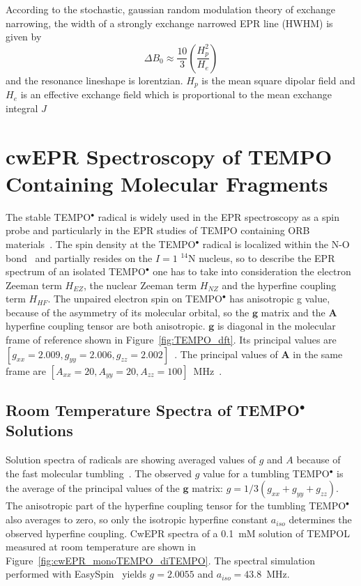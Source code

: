 According to the stochastic, gaussian random modulation theory of exchange narrowing, the width of a strongly exchange narrowed EPR line (HWHM) is given by
\begin{equation}
\label{eq:exch_narrowing}
\Delta B_0 \approx\frac{10}{3}\left(\frac{H_p^2}{H_e}\right)
\end{equation}
and the resonance lineshape is lorentzian. $H_p$ is the mean square dipolar field and $H_e$ is an effective exchange field which is proportional to the mean exchange integral $J$~\cite{Oreilly_1971}


\section{cwEPR Spectroscopy of TEMPO Containing Molecular Fragments}
The stable TEMPO$^\bullet$ radical is widely used in the EPR spectroscopy as a spin probe and particularly in the EPR studies of TEMPO containing ORB materials~\cite{nakahara2002_cpl, nishide2004_electact, bahaceci2013_jpowersources, aydin2015_jsoistatelect, khodeir2019_softmatter, Zhang2018}. The spin density at the TEMPO$^\bullet$ radical is localized within the N-O bond~\cite{Owenius2001} and partially resides on the $I=1$ $^{14}$N nucleus, so to describe the EPR spectrum of an isolated TEMPO$^\bullet$ one has to take into consideration the electron Zeeman term $H_{EZ}$, the nuclear Zeeman term $H_{NZ}$ and the hyperfine coupling term $H_{HF}$. The unpaired electron spin on TEMPO$^\bullet$ has anisotropic g value, because of the asymmetry of its molecular orbital, so the $\textbf{g}$ matrix and the $\textbf{A}$ hyperfine coupling tensor are both anisotropic. $\textbf{g}$ is diagonal in the molecular frame of reference shown in Figure~\ref{fig:TEMPO_dft}. Its principal values are $\left[g_{xx}=2.009,g_{yy}=2.006,g_{zz}=2.002\right]$~\cite{Liu_2008,Bordignon2017}. The principal values of $\textbf{A}$ in the same frame are $\left[A_{xx}=20,A_{yy}=20,A_{zz}=100\right]$~MHz~\cite{Liu_2008,Bordignon2017}.

\subsection{Room Temperature Spectra of TEMPO$^{\bullet}$ Solutions}
Solution spectra of radicals are showing averaged values of $g$ and $A$ because of the fast molecular tumbling~\cite{Liu_2008,Carrington_solution_epr}. The observed $g$ value for a tumbling TEMPO$^{\bullet}$ is the average of the principal values of the $\textbf{g}$ matrix: $g = 1/3\left(g_{xx}+g_{yy}+g_{zz}\right)$. The anisotropic part of the hyperfine coupling tensor for the tumbling TEMPO$^{\bullet}$ also averages to zero, so only the isotropic hyperfine constant $a_{iso}$ determines the observed hyperfine coupling. CwEPR spectra of a 0.1~mM solution of TEMPOL measured at room temperature are shown in Figure~\ref{fig:cwEPR_monoTEMPO_diTEMPO}. The spectral simulation performed with EasySpin~\cite{Stoll2006} yields $g=2.0055$ and $a_{iso}=43.8$~MHz.

